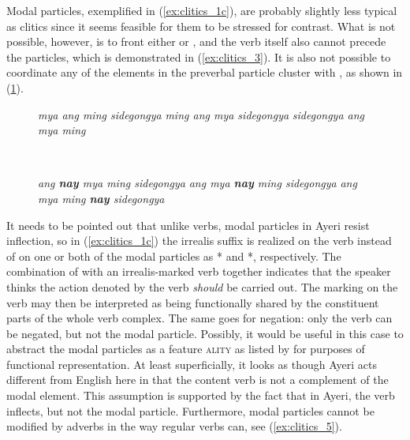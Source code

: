 \label{clitics_preverb_modal}
Modal particles, exemplified in (\ref{ex:clitics_1c}), are
probably slightly less typical as clitics since it seems feasible for them to
be stressed for contrast. What is not possible, however, is to front either
 or , and the verb itself
also cannot precede the particles, which is demonstrated in
(\ref{ex:clitics_3}). It is also not possible to coordinate any of the elements
in the preverbal particle cluster with , as shown in
(\ref{ex:clitics_4}).

\begin{figure}[h]
\begin{minipage}[t]{.5\linewidth}%
\pex\label{ex:clitics_3}%
\a \ljudge{*} \textit{mya ang ming sidegongya}
\a \ljudge{*} \textit{ming ang mya sidegongya}
\a \ljudge{*} \textit{sidegongya ang mya ming}
\xe
\end{minipage}
~
\begin{minipage}[t]{.5\linewidth}%
\pex\label{ex:clitics_4}%
\a \ljudge{*} \textit{ang \textbf{nay} mya ming sidegongya}
\a \ljudge{*} \textit{ang mya \textbf{nay} ming sidegongya}
\a \ljudge{*} \textit{ang mya ming \textbf{nay} sidegongya}
\xe
\end{minipage}
\end{figure}

It needs to be pointed out that unlike verbs, modal particles in Ayeri resist
inflection, so in (\ref{ex:clitics_1c}) the irrealis suffix 
is realized on the verb  instead
of on one or both of the modal particles as * and
*, respectively. The combination of  with an irrealis-marked verb together indicates that the speaker
thinks the action denoted by the verb \emph{should} be carried out. The marking
on the verb may then  be interpreted as being functionally shared by the
constituent parts of the whole verb complex. The same goes for negation: only
the verb can be negated, but not the modal particle. Possibly, it would be
useful in this case to abstract the modal particles as a feature
\Mod{}\textsc{ality} as listed by \citet[Feature Table]{pargram} for purposes
of functional representation. At least superficially, it looks as though Ayeri
acts different from English here in that the content verb is not a complement
of the modal element. This assumption is supported by the fact that in Ayeri,
the verb inflects, but not the modal particle. Furthermore, modal particles
cannot be modified by adverbs in the way regular verbs can, see
(\ref{ex:clitics_5}).

